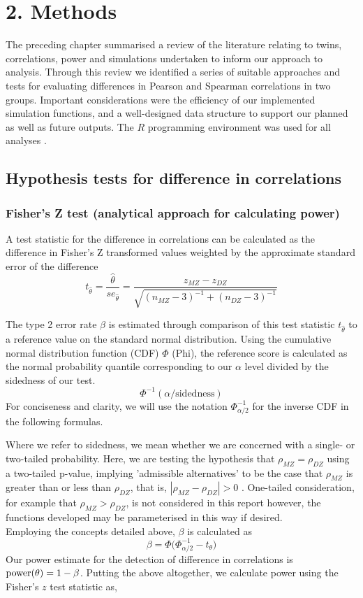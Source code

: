 \chapter*{2. Methods}
\setcounter{chapter}{2}
\setcounter{section}{0}

The preceding chapter summarised a review of the literature relating to twins, correlations, power and simulations undertaken to inform our approach to analysis.  Through this review we identified a series of suitable approaches and tests for evaluating differences in Pearson and Spearman correlations in two groups. Important considerations were the efficiency of our implemented simulation functions, and a well-designed data structure to support our planned as well as future outputs.  The $R$ programming environment was used for all analyses \cite{R2018}.

\section{Hypothesis tests for difference in correlations}
\subsection{Fisher's Z test (analytical approach for calculating power)}
A test statistic for the difference in correlations can be calculated as the difference in Fisher's Z transformed values weighted by the approximate standard error of the difference \cite{Fisher1990,David1938}
$$t_{\hat{\theta}} = {\frac{\hat{\theta}}{se_\hat{\theta}}} = {\frac{z_{MZ} - z_{DZ}}{\sqrt{(n_{MZ}-3)^{-1}+(n_{DZ}-3)^{-1}}}} $$

The type 2 error rate $\beta$ is estimated through comparison of this test statistic $t_{\hat{\theta}}$ to a reference value on the standard normal distribution.   Using the cumulative normal distribution function (CDF) $\Phi$ (Phi), the reference score is calculated as the normal probability quantile corresponding to our $\alpha$ level divided by the sidedness of our test. 
 $$\Phi^{-1}(\alpha/\text{sidedness})$$
For conciseness and clarity, we will use the notation $\Phi_{\alpha/2}^{-1}$  for the inverse CDF in the following formulas.
 
Where we refer to sidedness, we mean whether we are concerned with a single- or two-tailed probability.  Here, we are testing the hypothesis that $\rho_{MZ} = \rho_{DZ}$ using a two-tailed p-value, implying 'admissible alternatives' to be the case that $\rho_{MZ}$ is greater than or less than $\rho_{DZ}$, that is, $|\rho_{MZ} - \rho_{DZ}| > 0$ \cite{David1938}.  One-tailed consideration, for example that $\rho_{MZ} > \rho_{DZ}$, is not considered in this report however, the functions developed may be parameterised in this way if desired.  
\\
Employing the concepts detailed above, $\beta$ is calculated as 
$$\beta = \Phi \big( \Phi_{\alpha/2}^{-1} - t_\theta \big)$$
Our power estimate for the detection of difference in correlations is $\operatorname{power}(\theta) = 1 - \beta$. Putting the above altogether, we calculate power using the Fisher's $z$ test statistic as,

